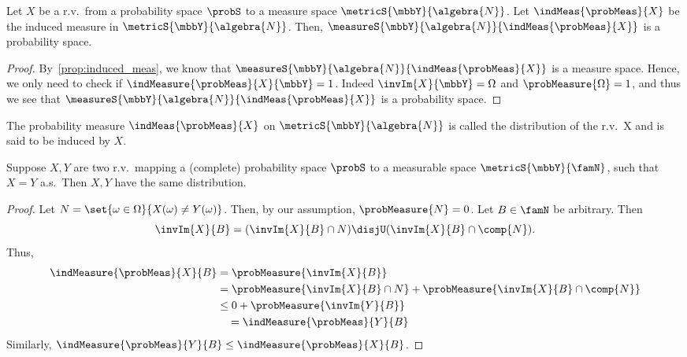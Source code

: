 \begin{Proposition}
    Let $X$ be a r.v.~from a probability space $\probS$ to a measure space $\metricS{\mbbY}{\algebra{N}}$.
    Let $\indMeas{\probMeas}{X}$ be the induced measure in $\metricS{\mbbY}{\algebra{N}}$. Then, 
    $\measureS{\mbbY}{\algebra{N}}{\indMeas{\probMeas}{X}}$ is a probability space.  
\end{Proposition}
\begin{proof}
    By~\ref{prop:induced_meas}, we know that $\measureS{\mbbY}{\algebra{N}}{\indMeas{\probMeas}{X}}$ is a
    measure space. Hence, we only need to check if $\indMeasure{\probMeas}{X}{\mbbY} = 1$. Indeed
    $\invIm{X}{\mbbY} = \Omega$ and $\probMeasure{\Omega} =1$, and thus we see that
    $\measureS{\mbbY}{\algebra{N}}{\indMeas{\probMeas}{X}}$ is a probability space.
\end{proof}
\begin{Definition}[name=Distribution]
    The probability measure $\indMeas{\probMeas}{X}$ on $\metricS{\mbbY}{\algebra{N}}$ is called the
    distribution of the r.v.~X and is said to be induced by $X$. 
\end{Definition}
\begin{Theorem}\label{thm:rv_equal_ae_distribution}
    Suppose $X,Y$ are two r.v.~mapping a (complete) probability space $\probS$ to a measurable space
    $\metricS{\mbbY}{\famN}$, 
    such that $X=Y$ a.s.~Then $X,Y$ have the same distribution.
\end{Theorem}
\begin{proof}
    Let $N = \set{\omega\in\Omega}{X(\omega) \neq Y(\omega)}$. Then, by our assumption, $\probMeasure{N} = 0$.
    Let $B \in \famN$ be arbitrary. Then \[\invIm{X}{B} = (\invIm{X}{B}\cap N) \disjU
    (\invIm{X}{B}\cap\comp{N}).\]
    Thus,
    \begin{align*}
	\indMeasure{\probMeas}{X}{B} &= \probMeasure{\invIm{X}{B}} \\  
	& = \probMeasure{\invIm{X}{B}\cap N} + \probMeasure{\invIm{X}{B}\cap\comp{N}} \\
	& \leq 0 + \probMeasure{\invIm{Y}{B}}\\
	&\quad = \indMeasure{\probMeas}{Y}{B}
    \end{align*}
    Similarly, $\indMeasure{\probMeas}{Y}{B} \leq \indMeasure{\probMeas}{X}{B}$.
\end{proof}

